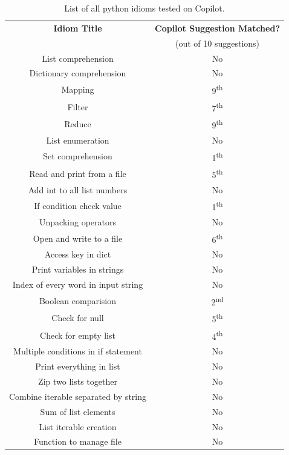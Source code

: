 \renewcommand{\arraystretch}{1.5}
\begin{table}[hbt]

    \begin{tabular}{|c|c|}
        \hline
    \centering
         \textbf{Idiom Title} & \textbf{Copilot Suggestion Matched?} \\
         & (out of 10 suggestions) \\
         \hline
         List comprehension & No \\
         \hline
         Dictionary comprehension & No \\
         \hline
         Mapping & 9\textsuperscript{th} \\
         \hline
         Filter &  7\textsuperscript{th} \\
         \hline
         Reduce & 9\textsuperscript{th} \\
         \hline
         List enumeration & No \\
         \hline
         Set comprehension & 1\textsuperscript{th} \\
         \hline
         Read and print from a file & 5\textsuperscript{th} \\
         \hline
         Add int to all list numbers & No \\
         \hline
         If condition check value & 1\textsuperscript{th} \\
         \hline
         Unpacking operators & No \\
         \hline
         Open and write to a file & 6\textsuperscript{th} \\
         \hline
         Access key in dict & No \\
         \hline
         Print variables in strings & No \\
         \hline
         Index of every word in input string & No \\
         \hline
         Boolean comparision & 2\textsuperscript{nd} \\
         \hline
         Check for null & 5\textsuperscript{th} \\
         \hline
         Check for empty list & 4\textsuperscript{th} \\
         \hline
         Multiple conditions in if statement & No \\
         \hline
         Print everything in list & No \\
         \hline
         Zip two lists together & No \\
         \hline
         Combine iterable separated by string & No \\
         \hline
         Sum of list elements & No \\
         \hline
         List iterable creation & No \\
         \hline
         Function to manage file & No \\
         \hline
    \end{tabular}
    \caption{List of all python idioms tested on Copilot.}
    \label{tab:all_idioms}
\end{table}


